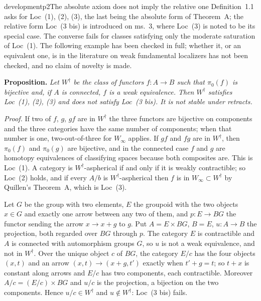 \begin{dcomment}{development}{p2}{The absolute axiom does not imply the relative one}
Definition~1.1 asks for Loc~(1), (2), (3), the last being the absolute form of Theorem~A; the relative form Loc~(3 bis) is introduced on ms.~3, where Loc~(3) is noted to be its special case. The converse fails for classes satisfying only the moderate saturation of Loc~(1). The following example has been checked in full; whether it, or an equivalent one, is in the literature on weak fundamental localizers has not been checked, and no claim of novelty is made.

\textbf{Proposition.}\ours
\textit{Let $W^\dagger$ be the class of functors $f:A\to B$ such that $\pi_0(f)$ is bijective and, if $A$ is connected, $f$ is a weak equivalence. Then $W^\dagger$ satisfies Loc~(1), (2), (3) and does not satisfy Loc~(3 bis). It is not stable under retracts.}

\textit{Proof.}
If two of $f$, $g$, $gf$ are in $W^\dagger$ the three functors are bijective on components and the three categories have the same number of components; when that number is one, two-out-of-three for $W_\infty$ applies. If $gf$ and $fg$ are in $W^\dagger$, then $\pi_0(f)$ and $\pi_0(g)$ are bijective, and in the connected case $f$ and $g$ are homotopy equivalences of classifying spaces because both composites are. This is Loc~(1). A category is $W^\dagger$-aspherical if and only if it is weakly contractible; so Loc~(2) holds, and if every $A/b$ is $W^\dagger$-aspherical then $f$ is in $W_\infty\subset W^\dagger$ by Quillen's Theorem~A, which is Loc~(3).

Let $G$ be the group with two elements, $E$ the groupoid with the two objects $x\in G$ and exactly one arrow between any two of them, and $p:E\to BG$ the functor sending the arrow $x\to x+g$ to $g$. Put $A=E\times BG$, $B=E$, $u:A\to B$ the projection, both regarded over $BG$ through $p$. The category $E$ is contractible and $A$ is connected with automorphism groups $G$, so $u$ is not a weak equivalence, and not in $W^\dagger$. Over the unique object $c$ of $BG$, the category $E/c$ has the four objects $(x,t)$ and an arrow $(x,t)\to(x+g,t')$ exactly when $t'+g=t$; so $t+x$ is constant along arrows and $E/c$ has two components, each contractible. Moreover $A/c=(E/c)\times BG$ and $u/c$ is the projection, a bijection on the two components. Hence $u/c\in W^\dagger$ and $u\notin W^\dagger$: Loc~(3 bis) fails.


\end{dcomment}
